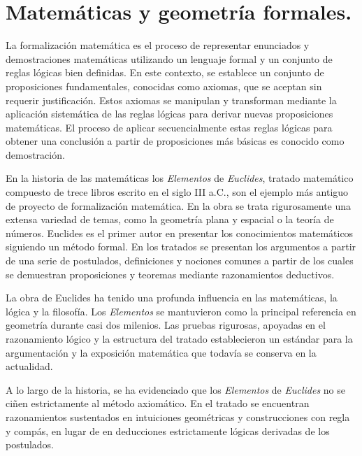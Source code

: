 \section{Matemáticas y geometría formales.}

La formalización matemática es el proceso de representar enunciados y
demostraciones matemáticas utilizando un lenguaje formal y un conjunto de reglas
lógicas bien definidas. En este contexto, se establece un conjunto de
proposiciones fundamentales, conocidas como axiomas, que se aceptan sin requerir
justificación. Estos axiomas se manipulan y transforman mediante la aplicación
sistemática de las reglas lógicas para derivar nuevas proposiciones matemáticas.
El proceso de aplicar secuencialmente estas reglas lógicas para obtener una
conclusión a partir de proposiciones más básicas es conocido como demostración.


En la historia de las matemáticas los \textit{Elementos} de \textit{Euclides},
tratado matemático compuesto de trece libros escrito en el siglo III a.C., son
el ejemplo más antiguo de proyecto de formalización matemática. En la obra se
trata rigurosamente una extensa variedad de temas, como la geometría plana y
espacial o la teoría de números. Euclides es el primer autor en presentar los
conocimientos matemáticos siguiendo un método formal. En los tratados se
presentan los argumentos a partir de una serie de postulados, definiciones y
nociones comunes a partir de los cuales se demuestran proposiciones y teoremas
mediante razonamientos deductivos.

La obra de Euclides ha tenido una profunda influencia en las matemáticas, la
lógica y la filosofía. Los \textit{Elementos} se mantuvieron como la principal
referencia en geometría durante casi dos milenios. Las pruebas rigurosas,
apoyadas en el razonamiento lógico y la estructura del tratado establecieron un
estándar para la argumentación y la exposición matemática que todavía se
conserva en la actualidad.

A lo largo de la historia, se ha evidenciado que los \textit{Elementos} de
\textit{Euclides} no se ciñen estrictamente al método axiomático. En el tratado
se encuentran razonamientos sustentados en intuiciones geométricas y
construcciones con regla y compás, en lugar de en deducciones estrictamente
lógicas derivadas de los postulados.

